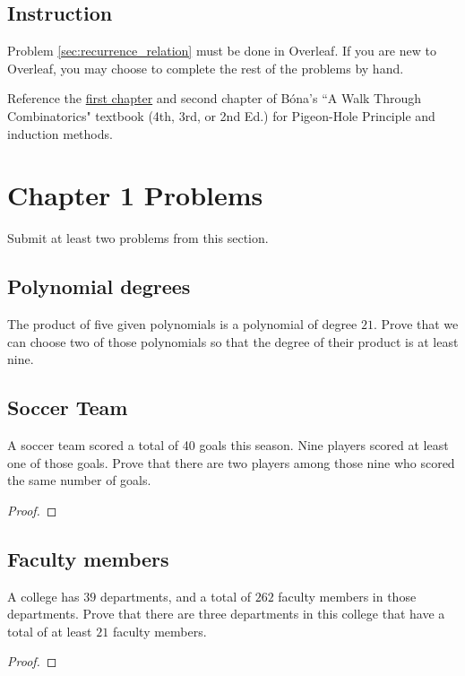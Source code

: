 \documentclass[11pt]{amsart}
\begin{document}
\subsection*{Instruction} 

Problem 
\ref{sec:recurrence_relation} must be done in Overleaf. 
If you are new to Overleaf, you may choose to complete the rest of the problems by hand.



Reference the  \href{https://www.worldscientific.com/doi/pdf/10.1142/9789813148857_0001}{first chapter} and second chapter of  B\'ona's ``A Walk Through Combinatorics" textbook (4th, 3rd, or 2nd Ed.) for Pigeon-Hole Principle and induction methods.

\bigskip




\section{Chapter 1 Problems}

Submit at least two problems from this section.



\subsection{Polynomial degrees}\label{sec:polynomial_degrees}
The product of five given polynomials is a polynomial of degree $21$. Prove that we can choose two of those polynomials so that the degree of their product is at least nine.







\subsection{Soccer Team} 
A soccer team scored a total of 40 goals this season. Nine players scored at least one of those goals. Prove that there are two players among those nine who scored the same number of goals.
\begin{proof}
\end{proof}



\subsection{Faculty members}
A college has $39$ departments, and a total of $262$ faculty members in those departments. Prove that there are three departments in this college that have a total of at least $21$ faculty members.
\begin{proof}
\end{proof}
\end{document}

